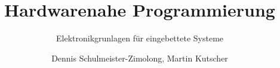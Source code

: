 \title{Hardwarenahe Programmierung}
\subtitle{Elektronikgrunlagen für eingebettete Systeme}
\author{Dennis Schulmeister-Zimolong, Martin Kutscher}

\renewcommand{\ubInstitute}{Studiengang Wirtschaftsinformatik}
\renewcommand{\ubModule}{IoT -- Technical Point of View}
\renewcommand{\ubType}{Aufgaben}
